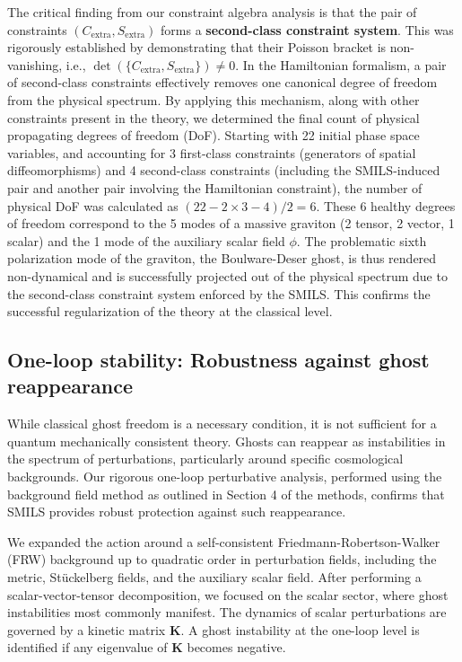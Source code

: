\documentclass[twocolumn]{aastex631}
\begin{document}
The critical finding from our constraint algebra analysis is that the pair of constraints $(C_{\text{extra}}, S_{\text{extra}})$ forms a \textbf{second-class constraint system}. This was rigorously established by demonstrating that their Poisson bracket is non-vanishing, i.e., $\det(\{C_{\text{extra}}, S_{\text{extra}}\}) \neq 0$. In the Hamiltonian formalism, a pair of second-class constraints effectively removes one canonical degree of freedom from the physical spectrum. By applying this mechanism, along with other constraints present in the theory, we determined the final count of physical propagating degrees of freedom (DoF). Starting with 22 initial phase space variables, and accounting for 3 first-class constraints (generators of spatial diffeomorphisms) and 4 second-class constraints (including the SMILS-induced pair and another pair involving the Hamiltonian constraint), the number of physical DoF was calculated as $(22 - 2 \times 3 - 4) / 2 = 6$. These 6 healthy degrees of freedom correspond to the 5 modes of a massive graviton (2 tensor, 2 vector, 1 scalar) and the 1 mode of the auxiliary scalar field $\phi$. The problematic sixth polarization mode of the graviton, the Boulware-Deser ghost, is thus rendered non-dynamical and is successfully projected out of the physical spectrum due to the second-class constraint system enforced by the SMILS. This confirms the successful regularization of the theory at the classical level.

\subsection{One-loop stability: Robustness against ghost reappearance}
While classical ghost freedom is a necessary condition, it is not sufficient for a quantum mechanically consistent theory. Ghosts can reappear as instabilities in the spectrum of perturbations, particularly around specific cosmological backgrounds. Our rigorous one-loop perturbative analysis, performed using the background field method as outlined in Section 4 of the methods, confirms that SMILS provides robust protection against such reappearance.

We expanded the action around a self-consistent Friedmann-Robertson-Walker (FRW) background up to quadratic order in perturbation fields, including the metric, Stückelberg fields, and the auxiliary scalar field. After performing a scalar-vector-tensor decomposition, we focused on the scalar sector, where ghost instabilities most commonly manifest. The dynamics of scalar perturbations are governed by a kinetic matrix $\mathbf{K}$. A ghost instability at the one-loop level is identified if any eigenvalue of $\mathbf{K}$ becomes negative.
\end{document}
